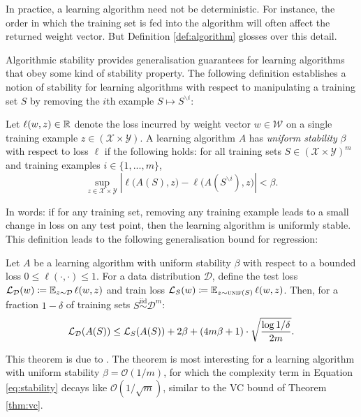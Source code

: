 \begin{refsection}
In practice, a learning algorithm need not be deterministic. For instance, the order in which the training set is fed into the algorithm will often affect the returned weight vector. But Definition \ref{def:algorithm} glosses over this detail.

Algorithmic stability provides generalisation guarantees for learning algorithms that obey some kind of stability property. The following definition establishes a notion of stability for learning algorithms with respect to manipulating a training set $S$ by removing the $i$th example $S\mapsto S^{\backslash i}$:

\begin{definition}\label{def:stability} Let $\ell(w,z)\in\mathbb{R}$ denote the loss incurred by weight vector $w\in \mathcal{W}$ on a single training example $z\in(\mathcal{X}\times\mathcal{Y})$. A learning algorithm $A$ has \textit{uniform stability} $\beta$ with respect to loss $\ell$ if the following holds: for all training sets $S\in(\mathcal{X}\times\mathcal{Y})^m$ and training examples $i\in\{1,...,m\}$, 
\begin{equation}
    \sup_{z\in \mathcal{X}\times\mathcal{Y}} \left|\ell\big(A(S),z\big) - \ell\big(A(S^{\backslash i}),z\big)\right|<\beta. 
\end{equation}
\end{definition}
In words: if for any training set, removing any training example leads to a small change in loss on any test point, then the learning algorithm is uniformly stable. This definition leads to the following generalisation bound for regression:

\begin{theorem}\label{thm:stability} Let $A$ be a learning algorithm with uniform stability $\beta$ with respect to a bounded loss $0\leq\ell(\cdot,\cdot)\leq 1$. For a data distribution $\mathcal{D}$, define the test loss $\mathcal{L}_\mathcal{D}(w)\coloneqq \operatorname{\mathbb{E}}_{z\sim\mathcal{D}}\ell(w,z)$ and train loss $\mathcal{L}_S(w)\coloneqq \operatorname{\mathbb{E}}_{z\sim\textsc{unif}(S)}\ell(w,z)$. Then, for a fraction $1-\delta$ of training sets $S\overset{\text{iid}}{\sim}\mathcal{D}^m$:
\begin{equation}\label{eq:stability}
    \mathcal{L}_\mathcal{D}(A(S)) \leq \mathcal{L}_S(A(S)) + 2\beta + (4m\beta + 1)\cdot\sqrt{\frac{\log 1/\delta}{2m}}.
\end{equation}
\end{theorem}

This theorem is due to \citet{stability}. The theorem is most interesting for a learning algorithm with uniform stability $\beta = \mathcal{O}(1/m)$, for which the complexity term in Equation \ref{eq:stability} decays like $\mathcal{O}(1/\sqrt{m})$, similar to the VC bound of Theorem \ref{thm:vc}.


\end{refsection}

